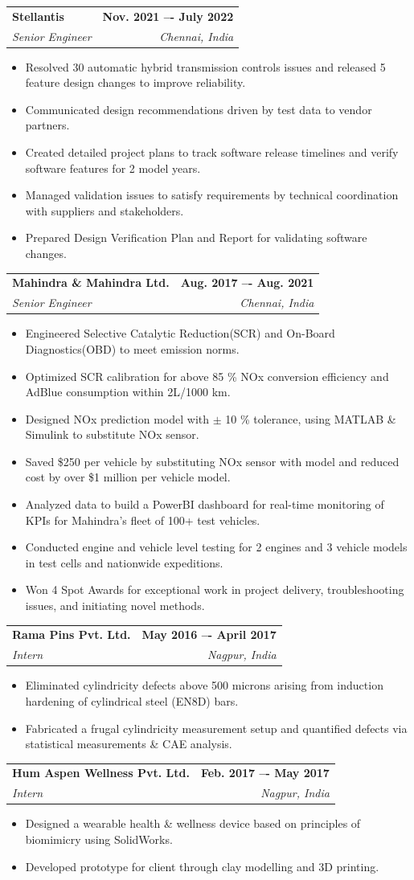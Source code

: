 \documentclass[letterpaper,11pt]{article}
\makeatletter
\newcommand{\resumeItem}[1]{
  \item\small{
    {#1 \vspace{-2pt}}
  }
}
\newcommand{\resumeSubheading}[4]{
  \vspace{-2pt}\item
    \begin{tabular*}{1.0\textwidth}[t]{l@{\extracolsep{\fill}}r}
      \textbf{#1} & \textbf{\small #2} \\
      \textit{\small#3} & \textit{\small #4} \\
    \end{tabular*}\vspace{-7pt}
}
\newcommand{\resumeItemListStart}{\begin{itemize}}
\newcommand{\resumeItemListEnd}{\end{itemize}\vspace{-5pt}}
\makeatother
\begin{document}
    \resumeSubheading
      {Stellantis}{Nov. 2021 –- July 2022}
      {Senior Engineer}{Chennai, India}
        \resumeItemListStart
        \resumeItem{Resolved 30 automatic hybrid transmission controls issues and released 5 feature design changes to improve reliability.}
        \resumeItem{Communicated design recommendations driven by test data to vendor partners.}
        \resumeItem{Created detailed project plans to track software release timelines and verify software features for 2 model years.}
        \resumeItem{Managed validation issues to satisfy requirements by technical coordination with suppliers and stakeholders.}
        \resumeItem{Prepared Design Verification Plan and Report for validating software changes.}
        \resumeItemListEnd

    \resumeSubheading
      {Mahindra \& Mahindra Ltd.}{Aug. 2017 –- Aug. 2021}
      {Senior Engineer}{Chennai, India}
        \resumeItemListStart
        \resumeItem{Engineered Selective Catalytic Reduction(SCR) and On-Board Diagnostics(OBD) to meet emission norms.}
        \resumeItem{Optimized SCR calibration for above 85 \% NOx conversion efficiency and AdBlue consumption within 2L/1000 km.}
        \resumeItem{Designed NOx prediction model with $\pm$ 10 \% tolerance, using MATLAB \& Simulink to substitute NOx sensor.}
        \resumeItem{Saved \$250 per vehicle by substituting NOx sensor with model and reduced cost by over \$1 million per vehicle model.}
        \resumeItem{Analyzed data to build a PowerBI dashboard for real-time monitoring of KPIs for Mahindra’s fleet of 100+ test vehicles.}
        \resumeItem{Conducted engine and vehicle level testing for 2 engines and 3 vehicle models in test cells and nationwide expeditions.}
        \resumeItem{Won 4 Spot Awards for exceptional work in project delivery, troubleshooting issues, and initiating novel methods.}
        \resumeItemListEnd
    
    \resumeSubheading
      {Rama Pins Pvt. Ltd.}{May 2016 –- April 2017}
      {Intern}{Nagpur, India}
        \resumeItemListStart
        \resumeItem{Eliminated cylindricity defects above 500 microns arising from induction hardening of cylindrical steel (EN8D) bars.}
        \resumeItem{Fabricated a frugal cylindricity measurement setup and quantified defects via statistical measurements \& CAE analysis.}
        \resumeItemListEnd

    \resumeSubheading
      {Hum Aspen Wellness Pvt. Ltd.}{Feb. 2017 –- May 2017}
      {Intern}{Nagpur, India}
        \resumeItemListStart
        \resumeItem{Designed a wearable health \& wellness device based on principles of biomimicry using SolidWorks.}
        \resumeItem{Developed prototype for client through clay modelling and 3D printing.}
        \resumeItemListEnd
    
\end{document}
